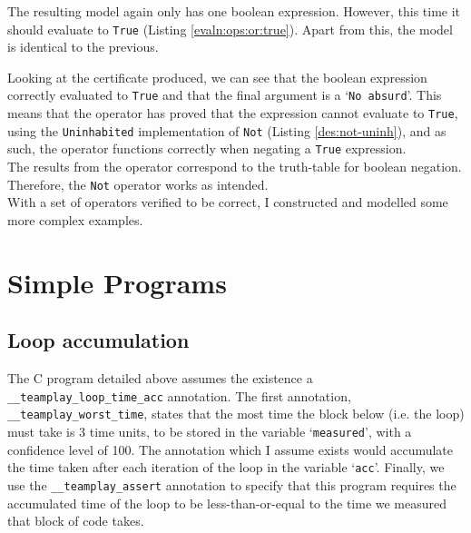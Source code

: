         The resulting \Idris model again only has one boolean expression. However, this time it should evaluate to \texttt{True} (Listing \ref{evaln:ops:or:true}). Apart from this, the model is identical to the previous.
        
        
        Looking at the certificate produced, we can see that the boolean expression correctly evaluated to \texttt{True} and that the final argument is a `\texttt{No absurd}'. This means that the operator has proved that the expression cannot evaluate to \texttt{True}, using the \texttt{Uninhabited} implementation of \texttt{Not} (Listing \ref{des:not-uninh}), and as such, the operator functions correctly when negating a \texttt{True} expression.
        \\
        
        The results from the operator correspond to the truth-table for boolean negation. Therefore, the \texttt{Not} operator works as intended.
        \\
        
        With a set of operators verified to be correct, I constructed and modelled some more complex examples.

\newpage


\section{Simple Programs}\label{evaln:progs}
    \subsection{Loop accumulation}\label{evaln:progs:loop}
        
        
        The C program detailed above assumes the existence a \texttt{\_\_teamplay\_loop\_time\_acc} annotation. The first annotation, \texttt{\_\_teamplay\_worst\_time}, states that the most time the block below (i.e. the loop) must take is 3 time units, to be stored in the variable `\texttt{measured}', with a confidence level of 100. The annotation which I assume exists would accumulate the time taken after each iteration of the loop in the variable `\texttt{acc}'. Finally, we use the \texttt{\_\_teamplay\_assert} annotation to specify that this program requires the accumulated time of the loop to be less-than-or-equal to the time we measured that block of code takes.
        

